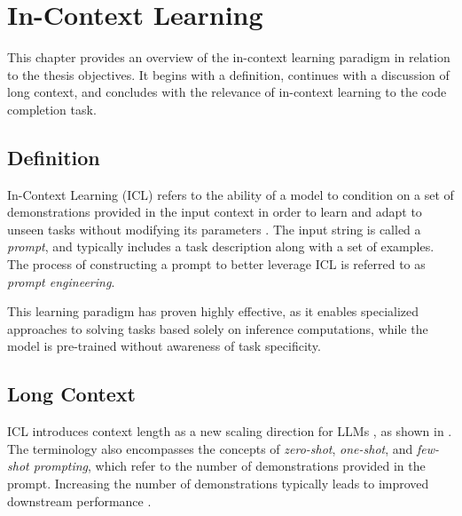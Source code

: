 \chapter{In-Context Learning}\label{chap:in-context-learning}

This chapter provides an overview of the in-context learning paradigm in relation to the thesis objectives. It begins with a definition, continues with a discussion of long context, and concludes with the relevance of in-context learning to the code completion task.

\section{Definition}

In-Context Learning (ICL) refers to the ability of a model to condition on a set of demonstrations provided in the input context in order to learn and adapt to unseen tasks without modifying its parameters \parencite{brown2020}. The input string is called a \textit{prompt}, and typically includes a task description along with a set of examples. The process of constructing a prompt to better leverage ICL is referred to as \textit{prompt engineering}.

This learning paradigm has proven highly effective, as it enables specialized approaches to solving tasks based solely on inference computations, while the model is pre-trained without awareness of task specificity.

\section{Long Context}

ICL introduces context length as a new scaling direction for LLMs \parencite{kaplan2020}, as shown in . The terminology also encompasses the concepts of \textit{zero-shot}, \textit{one-shot}, and \textit{few-shot prompting}, which refer to the number of demonstrations provided in the prompt. Increasing the number of demonstrations typically leads to improved downstream performance \parencite{brown2020}.

